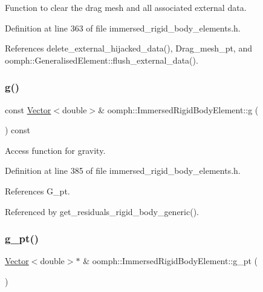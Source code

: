 Function to clear the drag mesh and all associated external data. 



Definition at line 363 of file immersed\+\_\+rigid\+\_\+body\+\_\+elements.\+h.



References delete\+\_\+external\+\_\+hijacked\+\_\+data(), Drag\+\_\+mesh\+\_\+pt, and oomph\+::\+Generalised\+Element\+::flush\+\_\+external\+\_\+data().

\mbox{\label{classoomph_1_1ImmersedRigidBodyElement_a01354ab471561d2703f8d391ae63f224}} 
\subsubsection{\texorpdfstring{g()}{g()}}
{\footnotesize\ttfamily const \hyperlink{classoomph_1_1Vector}{Vector}$<$double$>$\& oomph\+::\+Immersed\+Rigid\+Body\+Element\+::g (\begin{DoxyParamCaption}{ }\end{DoxyParamCaption}) const\hspace{0.3cm}{\ttfamily [inline]}}



Access function for gravity. 



Definition at line 385 of file immersed\+\_\+rigid\+\_\+body\+\_\+elements.\+h.



References G\+\_\+pt.



Referenced by get\+\_\+residuals\+\_\+rigid\+\_\+body\+\_\+generic().

\mbox{\label{classoomph_1_1ImmersedRigidBodyElement_a190a93393aa431b18f996dfb4b007080}} 
\subsubsection{\texorpdfstring{g\+\_\+pt()}{g\_pt()}}
{\footnotesize\ttfamily \hyperlink{classoomph_1_1Vector}{Vector}$<$double$>$$\ast$ \& oomph\+::\+Immersed\+Rigid\+Body\+Element\+::g\+\_\+pt (\begin{DoxyParamCaption}{ }\end{DoxyParamCaption})\hspace{0.3cm}{\ttfamily [inline]}}



